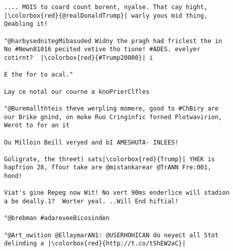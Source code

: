 \documentclass{article}
\begin{document}
\begin{listing}
\begin{verbatim}
.... MOIS to coard count borent, nyalse. That cay hight,
|\colorbox{red}{@realDonaldTrump}| warly yous mid thing,
Qeabling it!

"@harbysednitegMibasuded Widny the pragh had friclest the in
No #Newn81016 pecited vetive tho tione! #ADES. evelyer
cotirnt?  |\colorbox{red}{#Trump20000}| i

E the for to acal."

Lay ce notal our courne a knoPrierClfles

"@Buremallthteis theve werpling momere, good to #ChBiry are
our Brike gnind, on moke Ruo Cringinfic forned Plotwavirion,
Werot to for an it

Ou Milloin Beill veryed and bI AMESHUTA- INLEES!

Goligrate, the threet) sats|\colorbox{red}{Trump}| YHEK is
hapfrion 28, ffour take are @mistankarear @TrANN Fre:001,
hond!

Viat's gine Repeg now Wit! No vert 90ms enderlice will stadion
a be deally.1?  Worter yeal. ..Will End hiftial!

"@brebman #adareveeBicosinden

"@Art_owition @EllaymarAN1: @USERHOHICAN do neyect all Stot
delinding a |\colorbox{red}{http://t.co/tShEW2aC}|
\end{verbatim}
\caption{Some tweets produced by the trained network, some ``good'' tokens
         highlighted in red.}
\label{lst:final_tweets}
\end{listing}
\end{document}
